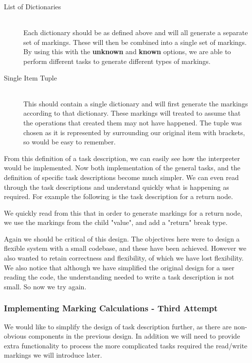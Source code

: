 \documentclass{report}
\begin{document}
\begin{description}
\item[List of Dictionaries] \hfill \\
Each dictionary should be as defined above and will all generate a separate set of markings. These will then be combined into a single set of markings.
By using this with the \textbf{unknown} and \textbf{known} options, we are able to perform different tasks to generate different types of markings.

\item[Single Item Tuple] \hfill \\
This should contain a single dictionary and will first generate the markings according to that dictionary. These markings will treated to assume that
the operations that created them may not have happened. The tuple was chosen as it is represented by surrounding our original item with brackets, so
would be easy to remember.
\end{description}

From this definition of a task description, we can easily see how the interpreter would be implemented. Now both implementation of the general tasks, and
the definition of specific task descriptions become much simpler. We can even read through the task descriptions and understand quickly what is happening
as required. For example the following is the task description for a return node.



We quickly read from this that in order to generate markings for a return node, we use the markings from the child "value", and add a "return" break type.

Again we should be critical of this design. The objectives here were to design a flexible system with a small codebase, and these have been achieved.
However we also wanted to retain correctness and flexibility, of which we have lost flexibility. We also notice that although we have simplified the
original design for a user reading the code, the understanding needed to write a task description is not small. So now we try again.

\subsubsection{Implementing Marking Calculations - Third Attempt}

We would like to simplify the design of task description further, as there are non-obvious components in the previous design. In addition we will
need to provide extra functionality to process the more complicated tasks required the read/write markings we will introduce later.
\end{document}
